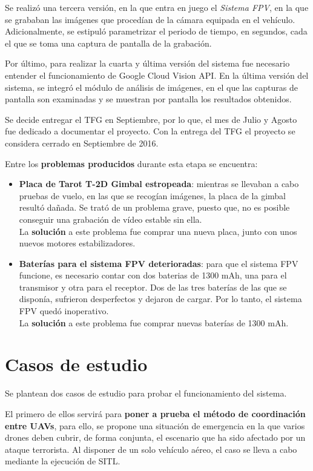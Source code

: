 Se realizó una tercera versión, en la que entra en juego el \textit{Sistema FPV}, en la que se grababan las imágenes que procedían de la cámara equipada en el vehículo. Adicionalmente, se estipuló parametrizar el periodo de tiempo, en segundos, cada el que se toma una captura de pantalla de la grabación.

Por último, para realizar la cuarta y última versión del sistema fue necesario entender el funcionamiento de Google Cloud Vision \acs{API}. En la última versión del sistema, se integró el módulo de análisis de imágenes, en el que las capturas de pantalla son examinadas y se muestran por pantalla los resultados obtenidos.

Se decide entregar el \acs{TFG} en Septiembre, por lo que, el mes de Julio y Agosto fue dedicado a documentar el proyecto. Con la entrega del \acs{TFG} el proyecto se considera cerrado en Septiembre de 2016.

Entre los \textbf{problemas producidos} durante esta etapa se encuentra:
\begin{itemize}
\item \textbf{Placa de Tarot T-2D Gimbal estropeada}: mientras se llevaban a cabo pruebas de vuelo, en las que se recogían imágenes, la placa de la gimbal resultó dañada. Se trató de un problema grave, puesto que, no es posible conseguir una grabación de vídeo estable sin ella. \\ La \textbf{solución} a este problema fue comprar una nueva placa, junto con unos nuevos motores estabilizadores.
\item \textbf{Baterías para el sistema \acs{FPV} deterioradas}: para que el sistema \acs{FPV} funcione, es necesario contar con dos baterias de 1300 mAh, una para el transmisor y otra para el receptor. Dos de las tres baterías de las que se disponía, sufrieron desperfectos y dejaron de cargar. Por lo tanto, el sistema \acs{FPV} quedó inoperativo. \\ La \textbf{solución} a este problema fue comprar nuevas baterías de 1300 mAh.
\end{itemize}

\section{Casos de estudio}

Se plantean dos casos de estudio para probar el funcionamiento del sistema. 

El primero de ellos servirá para \textbf{poner a prueba el método de coordinación entre \acs{UAV}s}, para ello, se propone una situación de emergencia en la que varios drones deben cubrir, de forma conjunta, el escenario que ha sido afectado por un ataque terrorista. Al disponer de un solo vehículo aéreo, el caso se lleva a cabo mediante la ejecución de \acs{SITL}.


